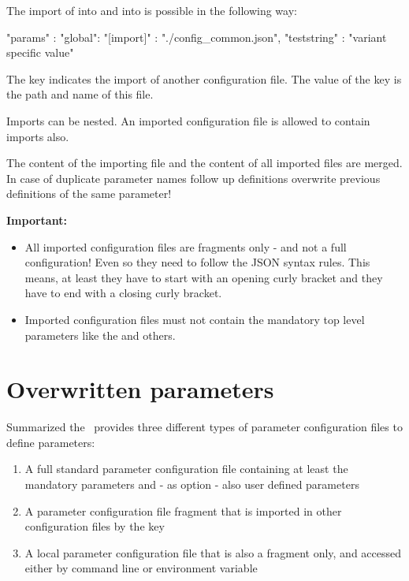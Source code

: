 The import of  into  and into  is possible in the following way:

\begin{pythonlog}
"params" : {
            "global": {
                       "[import]"   : "./config_common.json",
                       "teststring" : "variant specific value"
                      }
           }
\end{pythonlog}

The key \pcode{[import]} indicates the import of another configuration file. The value of the key is the path and name of this file.

Imports can be nested. An imported configuration file is allowed to contain imports also.

The content of the importing file and the content of all imported files are merged. In case of duplicate parameter names follow up definitions
overwrite previous definitions of the same parameter!

\textbf{Important:}

\begin{itemize}
   \item All imported configuration files are fragments only - and not a full configuration! Even so they need to follow the JSON syntax rules.
         This means, at least they have to start with an opening curly bracket and they have to end with a closing curly bracket.
   \item Imported configuration files must not contain the mandatory top level parameters like the  and others.
\end{itemize}

\newpage

\section{Overwritten parameters}

Summarized the \pkg\ provides three different types of parameter configuration files to define parameters:

\begin{enumerate}
   \item A full standard parameter configuration file containing at least the mandatory parameters and - as option - also user defined parameters
   \item A parameter configuration file fragment that is imported in other configuration files by the \pcode{[import]} key
   \item A local parameter configuration file that is also a fragment only, and accessed either by command line or environment variable
\end{enumerate}

